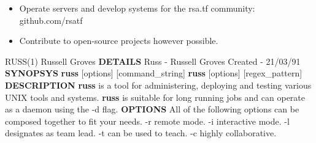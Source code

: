 \documentclass[10pt,a4paper]{altacv}
\begin{document}
\begin{paracol}{2}
\begin{itemize}
    \item Operate servers and develop systems for the rsa.tf community: github.com/rsatf
    \item Contribute to open-source projects however possible.
\end{itemize}

\begin{tcolorbox}[colback=black!5!white,colframe=red!75!black]
  RUSS(1) \hspace{1em} Russell Groves \newline
  \newline
  \textbf{DETAILS} \newline
  \hspace*{1em} Russ - Russell Groves \newline
  \hspace*{1em} Created - 21/03/91 \newline
  \newline
  \textbf{SYNOPSYS} \newline
  \textbf{russ} [options] [command\_string] \newline
  \textbf{russ} [options] [regex\_pattern] \newline
  \newline
  \textbf{DESCRIPTION} \newline
  \textbf{russ} is a tool for administering, deploying and testing various UNIX tools and systems. \newline
  \textbf{russ} is suitable for long running jobs and can operate as a daemon using the -d flag. \newline
  \newline
  \textbf{OPTIONS} \newline
  All of the following options can be composed together to fit your needs. \newline
  \newline
  -r \hspace{0.5em} remote mode. \newline
  -i \hspace{0.5em} interactive mode. \newline
  -l \hspace{0.5em} designates as team lead. \newline
  -t \hspace{0.5em} can be used to teach. \newline
  -c \hspace{0.5em} highly collaborative. \newline

\end{tcolorbox}
\end{paracol}
\end{document}
